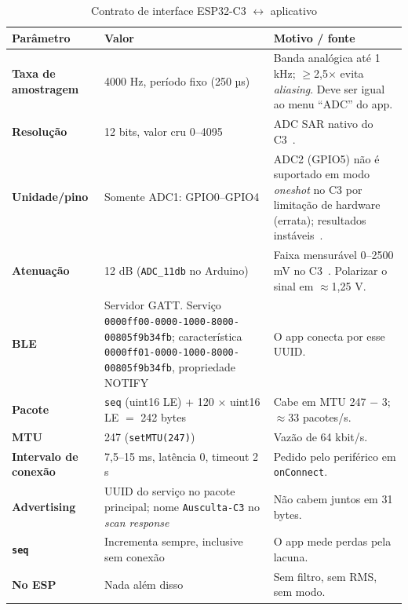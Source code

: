 \documentclass[conference,a4paper]{IEEEtran}
\newcommand{\code}[1]{\texttt{#1}}
\begin{document}
\begin{table}[t]
\caption{Contrato de interface ESP32-C3 $\leftrightarrow$ aplicativo}
\label{tab:esp}
\centering\footnotesize
\begin{tabularx}{\columnwidth}{@{}>{\bfseries}p{1.75cm}p{3.1cm}Y@{}}
\toprule
Parâmetro & Valor & Motivo / fonte\\
\midrule
Taxa de amostragem & 4000 Hz, período fixo (250 µs) & Banda analógica até 1 kHz; $\geq$2,5$\times$ evita \emph{aliasing}. Deve ser igual ao menu ``ADC'' do app.\\
Resolução & 12 bits, valor cru 0--4095 & ADC SAR nativo do C3~\cite{esp32c3-ds}.\\
Unidade/pino & Somente ADC1: GPIO0--GPIO4 & ADC2 (GPIO5) não é suportado em modo \emph{oneshot} no C3 por limitação de hardware (errata); resultados instáveis~\cite{idf-adc}.\\
Atenuação & 12 dB (\code{ADC\_11db} no Arduino) & Faixa mensurável 0--2500 mV no C3~\cite{idf-adc}. Polarizar o sinal em $\approx$1,25 V.\\
BLE & Servidor GATT. Serviço \code{0000ff00-0000-1000-}\allowbreak\code{8000-00805f9b34fb}; característica \code{0000ff01-0000-1000-}\allowbreak\code{8000-00805f9b34fb}, propriedade NOTIFY & O app conecta por esse UUID.\\
Pacote & \code{seq} (uint16 LE) + 120 $\times$ uint16 LE $=$ 242 bytes & Cabe em MTU 247 $-$ 3; $\approx$33 pacotes/s.\\
MTU & 247 (\code{setMTU(247)}) & Vazão de 64 kbit/s.\\
Intervalo de conexão & 7,5--15 ms, latência 0, timeout 2 s & Pedido pelo periférico em \code{onConnect}.\\
Advertising & UUID do serviço no pacote principal; nome \code{Ausculta-C3} no \emph{scan response} & Não cabem juntos em 31 bytes.\\
\code{seq} & Incrementa sempre, inclusive sem conexão & O app mede perdas pela lacuna.\\
No ESP & Nada além disso & Sem filtro, sem RMS, sem modo.\\
\bottomrule
\end{tabularx}
\end{table}
\end{document}
